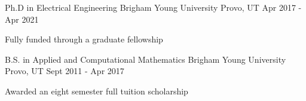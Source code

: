 

\begin{cventries}

  \cventry
    {Ph.D in Electrical Engineering} %
    {Brigham Young University} %
    {Provo, UT} %
    {Apr 2017 - Apr 2021} %
    {
      \begin{cvitems}
        \item {Fully funded through a graduate fellowship}
      \end{cvitems}
    }

  \cventry
    {B.S. in Applied and Computational Mathematics} %
    {Brigham Young University} %
    {Provo, UT} %
    {Sept 2011 - Apr 2017} %
    {
      \begin{cvitems} %
        \item {Awarded an eight semester full tuition scholarship}
      \end{cvitems}
    }

\end{cventries}
